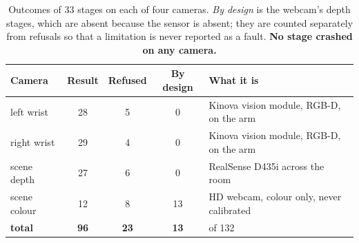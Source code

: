 \begin{table}[htbp]
  \centering
  \small
  \caption[Stage outcomes by camera]{Outcomes of \num{33} stages on each of
  four cameras. \emph{By design} is the webcam's depth stages, which are
  absent because the sensor is absent; they are counted separately from
  refusals so that a limitation is never reported as a fault. \textbf{No
  stage crashed on any camera.}}
  \label{tab:vision-stages}
  \begin{tabular}{@{}lcccl@{}}
    \toprule
    Camera & Result & Refused & By design & What it is \\
    \midrule
    left wrist  & 28 & 5 & 0
      & Kinova vision module, RGB-D, on the arm \\
    right wrist & 29 & 4 & 0
      & Kinova vision module, RGB-D, on the arm \\
    scene depth & 27 & 6 & 0
      & RealSense D435i across the room \\
    scene colour & 12 & 8 & 13
      & HD webcam, colour only, never calibrated \\
    \midrule
    \textbf{total} & \textbf{96} & \textbf{23} & \textbf{13} & of \num{132} \\
    \bottomrule
  \end{tabular}
\end{table}

